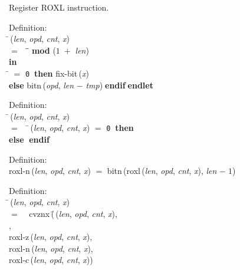  Register ROXL instruction.
\begin{tabbing}{\sc Definition}: \\  
\=\,({\it{len\/}}, {\it{opd\/}}, {\it{cnt\/}}, {\it{x\/}}) \\ 
$=$$\;\;\;\;$\=\= ${}${\bf{mod}}${}$ ($1\;+$ {\it{len\/}})\- \\ 
{\bf in} \\ 
\= $=$ {\tt{0}}$\;\;${\bf then }{\rm{fix-bit}}\,({\it{x\/}}) \\ 
{\bf else }{\rm{bitn}}\,({\it{opd\/}}, {\it{len\/}} $-$ {\it{tmp\/}})$\;${\bf  endif}\-$\;${\bf  endlet}\-\-
\end{tabbing}

\begin{tabbing}{\sc Definition}: \\  
\=\,({\it{len\/}}, {\it{opd\/}}, {\it{cnt\/}}, {\it{x\/}}) \\ 
$=$$\;\;\;\;$\=\,({\it{len\/}}, {\it{opd\/}}, {\it{cnt\/}}, {\it{x\/}}) $=$ {\tt{0}}$\;\;${\bf then }{} \\ 
{\bf else }{}$\;${\bf  endif}\-\-
\end{tabbing}

\begin{tabbing}{\sc Definition}: \\  
{\rm{roxl-n}}\,({\it{len\/}}, {\it{opd\/}}, {\it{cnt\/}}, {\it{x\/}}) $=$ {\rm{bitn}}\,({\rm{roxl}}\,({\it{len\/}}, {\it{opd\/}}, {\it{cnt\/}}, {\it{x\/}}), {\it{len\/}} $-\;1$)
\end{tabbing}

\begin{tabbing}{\sc Definition}: \\  
\=\,({\it{len\/}}, {\it{opd\/}}, {\it{cnt\/}}, {\it{x\/}}) \\ 
$=$$\;\;\;\;${\rm{cvznx}}\,(\=\,({\it{len\/}}, {\it{opd\/}}, {\it{cnt\/}}, {\it{x\/}}), \\ 
{}, \\ 
{\rm{roxl-z}}\,({\it{len\/}}, {\it{opd\/}}, {\it{cnt\/}}, {\it{x\/}}), \\ 
{\rm{roxl-n}}\,({\it{len\/}}, {\it{opd\/}}, {\it{cnt\/}}, {\it{x\/}}), \\ 
{\rm{roxl-c}}\,({\it{len\/}}, {\it{opd\/}}, {\it{cnt\/}}, {\it{x\/}}))\-\-
\end{tabbing}

